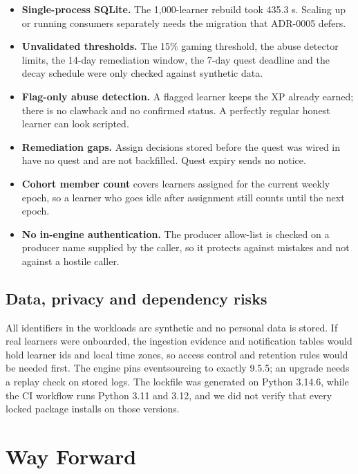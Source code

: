 \documentclass[11pt,a4paper]{article}
\renewcommand{\_}{\textunderscore\allowbreak{}}
\begin{document}
\begin{itemize}
    \item \textbf{Single-process SQLite.} The 1,000-learner rebuild took 435.3 s. Scaling up or running consumers separately needs the migration that ADR-0005 defers.
    \item \textbf{Unvalidated thresholds.} The 15\% gaming threshold, the abuse detector limits, the 14-day remediation window, the 7-day quest deadline and the decay schedule were only checked against synthetic data.
    \item \textbf{Flag-only abuse detection.} A flagged learner keeps the XP already earned; there is no clawback and no confirmed status. A perfectly regular honest learner can look scripted.
    \item \textbf{Remediation gaps.} Assign decisions stored before the quest was wired in have no quest and are not backfilled. Quest expiry sends no notice.
    \item \textbf{Cohort member count} covers learners assigned for the current weekly epoch, so a learner who goes idle after assignment still counts until the next epoch.
    \item \textbf{No in-engine authentication.} The producer allow-list is checked on a producer name supplied by the caller, so it protects against mistakes and not against a hostile caller.
\end{itemize}

\subsection{Data, privacy and dependency risks}

All identifiers in the workloads are synthetic and no personal data is stored. If real learners were onboarded, the ingestion evidence and notification tables would hold learner ids and local time zones, so access control and retention rules would be needed first. The engine pins eventsourcing to exactly 9.5.5; an upgrade needs a replay check on stored logs. The lockfile was generated on Python 3.14.6, while the CI workflow runs Python 3.11 and 3.12, and we did not verify that every locked package installs on those versions.

\section{Way Forward}
\end{document}
